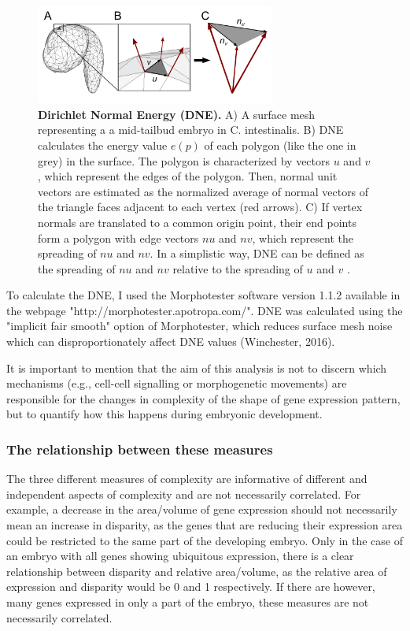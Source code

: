 \begin{figure}[h]
  \includegraphics[width=0.7\textwidth]{./Images/DNE.png}
  \centering
  \caption{\textbf{Dirichlet Normal Energy (DNE).} A) A surface mesh representing a a mid-tailbud embryo in C. intestinalis. B) DNE calculates the energy value $e(p)$ of each polygon (like the one in grey) in the surface. The polygon is characterized by vectors $u$ and $v$, which represent the edges of the polygon. Then, normal unit vectors are estimated as the normalized average of normal vectors of the triangle faces adjacent to each vertex (red arrows). C) If vertex normals are translated to a common origin point, their end points form a polygon with edge vectors $nu$ and $nv$, which represent the spreading of $nu$ and $nv$. In a simplistic way, DNE can be defined as the spreading of $nu$ and $nv$ relative to the spreading of $u$ and $v$ \citep{Bunn2011,Winchester2016}. 
 }
  \label{fig:DNE}
\end{figure}

To calculate the DNE, I used the Morphotester software version 1.1.2 \citep{Winchester2016}
available in the webpage "http://morphotester.apotropa.com/". DNE was calculated using the "implicit
fair smooth" option of Morphotester, which reduces surface mesh noise which can disproportionately affect DNE values (Winchester, 2016). 

It is important to mention that the aim of this analysis is not to discern which mechanisms (e.g., cell-cell signalling or morphogenetic movements) are responsible for the changes in complexity of the shape of gene expression pattern, but to quantify how this happens during embryonic development.

\subsubsection{The relationship between these measures}

The three different measures of complexity are informative of different and independent aspects of complexity and are not necessarily correlated. 
For example, a decrease in the area/volume of gene expression should not necessarily mean an increase in disparity, as the genes that are reducing their expression area could be restricted to the same part of the developing embryo. 
Only in the case of an embryo with all genes showing ubiquitous expression, there is a clear relationship between disparity and relative area/volume, as the relative area of expression and disparity would be 0 and 1 respectively. If there are however, many genes expressed in only a part of the embryo, these measures are not necessarily correlated. 


